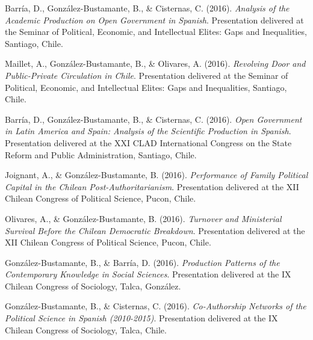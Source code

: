 \begin{publications}
\begin{benumerate}{66}
\item{\small Barría, D., González-Bustamante, B., \& Cisternas, C. (2016). {\itshape Analysis of the Academic Production on Open Government in Spanish}. Presentation delivered at the Seminar of Political, Economic, and Intellectual Elites: Gaps and Inequalities, Santiago, Chile.}\vspace{1mm}

\item{\small Maillet, A., González-Bustamante, B., \& Olivares, A. (2016). {\itshape Revolving Door and Public-Private Circulation in Chile}. Presentation delivered at the Seminar of Political, Economic, and Intellectual Elites: Gaps and Inequalities, Santiago, Chile.}\vspace{1mm}

\item{\small Barría, D., González-Bustamante, B., \& Cisternas, C. (2016). {\itshape Open Government in Latin America and Spain: Analysis of the Scientific Production in Spanish}. Presentation delivered at the XXI CLAD International Congress on the State Reform and Public Administration, Santiago, Chile.}\vspace{1mm}

\item{\small Joignant, A., \& González-Bustamante, B. (2016). {\itshape Performance of Family Political Capital in the Chilean Post-Authoritarianism}. Presentation delivered at the XII Chilean Congress of Political Science, Pucon, Chile.}\vspace{1mm}

\item{\small Olivares, A., \& González-Bustamante, B. (2016). {\itshape Turnover and Ministerial Survival Before the Chilean Democratic Breakdown}. Presentation delivered at the XII Chilean Congress of Political Science, Pucon, Chile.}\vspace{1mm}

\item{\small González-Bustamante, B., \& Barría, D. (2016). {\itshape Production Patterns of the Contemporary Knowledge in Social Sciences}. Presentation delivered at the IX Chilean Congress of Sociology, Talca, González.}\vspace{1mm}

\item{\small González-Bustamante, B., \& Cisternas, C. (2016). {\itshape Co-Authorship Networks of the Political Science in Spanish (2010-2015)}. Presentation delivered at the IX Chilean Congress of Sociology, Talca, Chile.}\vspace{1mm}


\end{benumerate}
\end{publications}

